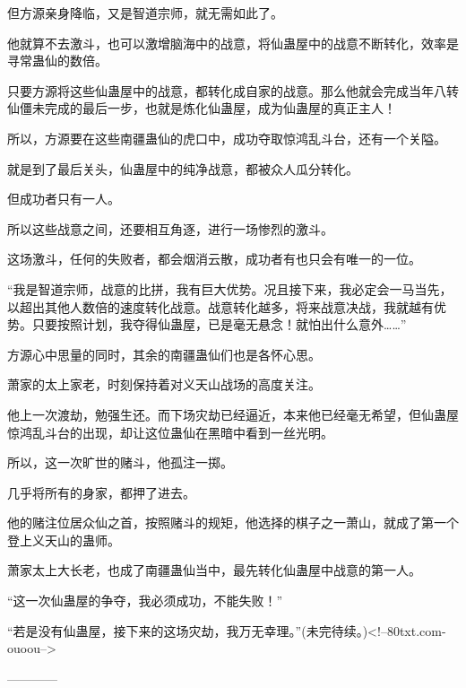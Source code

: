 \begin{this_body}
但方源亲身降临，又是智道宗师，就无需如此了。

他就算不去激斗，也可以激增脑海中的战意，将仙蛊屋中的战意不断转化，效率是寻常蛊仙的数倍。

只要方源将这些仙蛊屋中的战意，都转化成自家的战意。那么他就会完成当年八转仙僵未完成的最后一步，也就是炼化仙蛊屋，成为仙蛊屋的真正主人！

所以，方源要在这些南疆蛊仙的虎口中，成功夺取惊鸿乱斗台，还有一个关隘。

就是到了最后关头，仙蛊屋中的纯净战意，都被众人瓜分转化。

但成功者只有一人。

所以这些战意之间，还要相互角逐，进行一场惨烈的激斗。

这场激斗，任何的失败者，都会烟消云散，成功者有也只会有唯一的一位。

“我是智道宗师，战意的比拼，我有巨大优势。况且接下来，我必定会一马当先，以超出其他人数倍的速度转化战意。战意转化越多，将来战意决战，我就越有优势。只要按照计划，我夺得仙蛊屋，已是毫无悬念！就怕出什么意外……”

方源心中思量的同时，其余的南疆蛊仙们也是各怀心思。

萧家的太上家老，时刻保持着对义天山战场的高度关注。

他上一次渡劫，勉强生还。而下场灾劫已经逼近，本来他已经毫无希望，但仙蛊屋惊鸿乱斗台的出现，却让这位蛊仙在黑暗中看到一丝光明。

所以，这一次旷世的赌斗，他孤注一掷。

几乎将所有的身家，都押了进去。

他的赌注位居众仙之首，按照赌斗的规矩，他选择的棋子之一萧山，就成了第一个登上义天山的蛊师。

萧家太上大长老，也成了南疆蛊仙当中，最先转化仙蛊屋中战意的第一人。

“这一次仙蛊屋的争夺，我必须成功，不能失败！”

“若是没有仙蛊屋，接下来的这场灾劫，我万无幸理。”(未完待续。)<!--80txt.com-ouoou-->

------------

\end{this_body}

